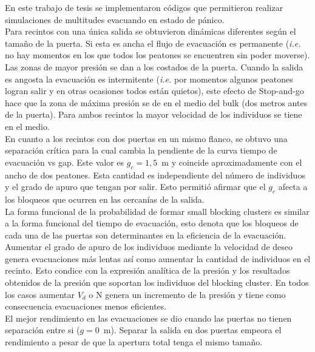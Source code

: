 En este trabajo de tesis se implementaron códigos que permitieron realizar simulaciones de multitudes evacuando en estado de pánico. \\

Para recintos con una única salida se obtuvieron dinámicas diferentes según el tamaño de la puerta. Si esta es ancha el flujo de evacuación es permanente (\emph{i.e.} no hay momentos en los que todos los peatones se encuentren sin poder moverse). Las zonas de mayor presión se dan a los costados de la puerta. Cuando la salida es angosta la evacuación es intermitente (\emph{i.e.} por momentos algunos peatones logran salir y en otras ocasiones todos están quietos), este efecto de Stop-and-go hace que la zona de máxima presión se de en el medio del bulk (dos metros antes de la puerta). 
Para ambos recintos la mayor velocidad de los individuos se tiene en el medio. \\
En cuanto a los recintos con dos puertas en un mismo flanco, se obtuvo  una separación crítica para la cual cambia la pendiente de la curva tiempo de evacuación vs gap. Este valor es $g_c=1,5$~m y coincide aproximadamente con el ancho de dos peatones. Esta cantidad es independiente del número de individuos y el grado de apuro que tengan por salir. Esto permitió afirmar que el $g_c$ afecta a los bloqueos que ocurren en las cercanías de la salida. \\

La forma funcional de la probabilidad de formar small blocking clusters es similar a la forma funcional del tiempo de evacuación, esto denota que los bloqueos de cada una de las puertas son determinantes en la eficiencia de la evacuación. \\

Aumentar el grado de apuro de los individuos mediante la velocidad de deseo genera evacuaciones más lentas así como aumentar la cantidad de individuos en el recinto. Esto condice con la expresión analítica de la presión y los resultados obtenidos de la presión que soportan los individuos del blocking cluster. En todos los casos aumentar $V_d$ o N genera un incremento de la presión y tiene como consecuencia evacuaciones menos eficientes.\\

El mejor rendimiento en las evacuaciones se dio cuando las puertas no tienen separación entre si ($g=0$~m). Separar la salida en dos puertas empeora el rendimiento a pesar de que la apertura total tenga el mismo tamaño.   
